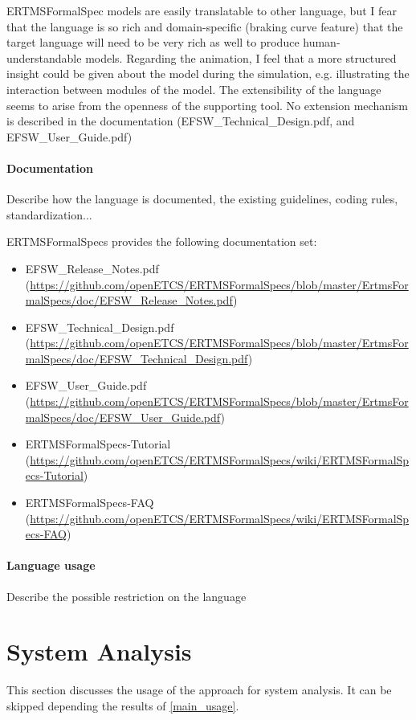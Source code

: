 \begin{assessor1}
ERTMSFormalSpec models are easily translatable to other language, but I fear that the language is so rich and domain-specific (braking curve feature) that the target language will need to be very rich as well to produce human-understandable models. Regarding the animation, I feel that a more structured insight could be given about the model during the simulation, e.g. illustrating the interaction between modules of the model. The extensibility of the language seems to arise from the openness of the supporting tool. No extension mechanism is described in the documentation (EFSW\_Technical\_Design.pdf, and EFSW\_User\_Guide.pdf)
\end{assessor1}

\paragraph{Documentation} Describe how the language is documented, the existing guidelines, coding rules, standardization...

ERTMSFormalSpecs provides the following documentation set:

\begin{itemize}
	\item EFSW\_Release\_Notes.pdf (\url{https://github.com/openETCS/ERTMSFormalSpecs/blob/master/ErtmsFormalSpecs/doc/EFSW\_Release\_Notes.pdf})
	\item EFSW\_Technical\_Design.pdf (\url{https://github.com/openETCS/ERTMSFormalSpecs/blob/master/ErtmsFormalSpecs/doc/EFSW\_Technical\_Design.pdf})
	\item EFSW\_User\_Guide.pdf (\url{https://github.com/openETCS/ERTMSFormalSpecs/blob/master/ErtmsFormalSpecs/doc/EFSW\_User\_Guide.pdf})
	\item ERTMSFormalSpecs-Tutorial (\url{https://github.com/openETCS/ERTMSFormalSpecs/wiki/ERTMSFormalSpecs-Tutorial})
	\item ERTMSFormalSpecs-FAQ (\url{https://github.com/openETCS/ERTMSFormalSpecs/wiki/ERTMSFormalSpecs-FAQ})
\end{itemize}

\paragraph{Language usage} Describe the possible restriction on the language

\section{System Analysis}
This section discusses the usage of the approach for system analysis.
It can be skipped depending the results of \ref{main_usage}.


